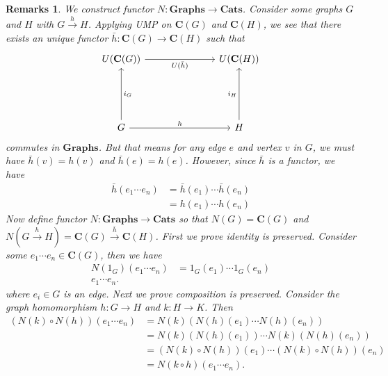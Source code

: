 \documentclass[a4paper, 11pt]{book}
\theoremstyle{plain}
\newtheorem*{remarks}{Remarks}
\theoremstyle{plain}
\newcommand{\mb}{\mathbf}
\newcommand{\arr}{\rightarrow}
\newcommand{\warr}{\xrightarrow}
\newcommand{\C}{\mathbf{C}}
\begin{document}
    \begin{remarks}
      We construct functor $N: \mb{Graphs} \arr \mb{Cats}$. Consider some graphs $G$ and $H$ with $G \warr{h} H$. Applying UMP on $\C(G)$ and $\C(H)$, we see that there exists an unique functor $\bar{h}:\C(G) \arr \C(H)$ such that 
      \[\begin{tikzcd}
        {U(\mathbf{C}(G))} &&& {U(\mathbf{C}(H))} \\
        \\
        \\
        G &&& H
        \arrow["h", from=4-1, to=4-4]
        \arrow["{i_H}", from=4-4, to=1-4]
        \arrow["{i_G}"', from=4-1, to=1-1]
        \arrow["{U(\bar{h})}"', from=1-1, to=1-4]
      \end{tikzcd}\]
      commutes in $\mb{Graphs}$. But that means for any edge $e$ and vertex $v$ in $G$, we must have $\bar{h}(v)=h(v)$ and $\bar{h}(e)=h(e)$. However, since $\bar{h}$ is a functor, we have 
      \begin{align*}
        \bar{h}(e_1 \cdots e_n) &= \bar{h}(e_1)\cdots \bar{h}(e_n) \\
        &= h(e_1) \cdots h(e_n)
      \end{align*}
      Now define functor $N:\mb{Graphs} \arr \mb{Cats}$ so that $N(G)=\C(G)$ and $N(G \warr{h} H)=\C(G) \warr{\bar{h}} \C(H)$. First we prove identity is preserved. Consider some $e_1 \cdots e_n \in \C(G)$, then we have 
      \begin{align*}
        N(1_{G})(e_1 \cdots e_n) &= 1_G(e_1) \cdots 1_G(e_n) \\
        e_1 \cdots e_n.
      \end{align*}
      where $e_i \in G$ is an edge. Next we prove composition is preserved. Consider the graph homomorphism $h:G \arr H$ and $k:H \arr K$. Then 
      \begin{align*}
        (N(k) \circ N(h)) (e_1 \cdots e_n) &=   N(k) (N(h)(e_1) \cdots N(h)(e_n)) \\
        &=N(k)(N(h) (e_1)) \cdots N(k)  (N(h) (e_n)) \\
        &=(N(k) \circ N(h))(e_1) \cdots (N(k) \circ N(h))(e_n) \\
        &=N(k \circ h)(e_1 \cdots e_n).
      \end{align*}
    \end{remarks}
\end{document}
